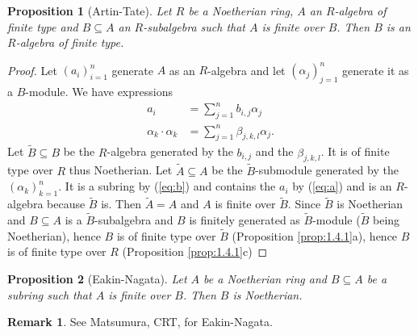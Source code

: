 \documentclass[DIV=14,parskip=half]{scrartcl}
\newtheorem{prop}{Proposition}[subsection]
\theoremstyle{definition}
\newtheorem{rem}{Remark}[subsection]
\begin{document}
 \begin{prop}[Artin-Tate]\label{prop:artinTate}
  Let $R$ be a Noetherian ring, $A$ an $R$-algebra of finite type and $B\subseteq A$ an $R$-subalgebra such that $A$ is finite over $B$. Then $B$ is an $R$-algebra of finite type.
 \end{prop}
 \begin{proof}
 Let $(a_i)_{i=1}^n$ generate $A$ as an $R$-algebra and let $(\alpha_j)_{j=1}^n$ generate it as a $B$-module. We have expressions
 \begin{align}
  a_i &=\sum_{j=1}^n b_{i,j} \alpha_j\label{eq:a}\\
  \alpha_k\cdot \alpha_k &= \sum_{j=1}^n \beta_{j,k,l} \alpha_j.\label{eq:b}
 \end{align}
Let $\tilde B\subseteq B$ be the $R$-algebra generated by the $b_{i,j}$ and the $\beta_{j,k,l}$. It is of finite type over $R$ thus Noetherian. Let $\tilde A\subseteq A$ be the $\tilde B$-submodule generated by the $(\alpha_k)_{k=1}^n$. It is a subring by (\ref{eq:b}) and contains the $a_i$ by (\ref{eq:a}) and is an $R$-algebra because $\tilde B$ is. Then $\tilde A=A$ and $A$ is finite over $\tilde B$. Since $\tilde B$ is Noetherian and $B\subseteq A$ is a $\tilde B$-subalgebra and $B$ is finitely generated as $\tilde B$-module ($\tilde B$ being Noetherian), hence $B$ is of finite type over $\tilde B$ (Proposition \ref{prop:1.4.1}a), hence $B$ is of finite type over $R$ (Proposition \ref{prop:1.4.1}c)
\end{proof}
\begin{prop}[Eakin-Nagata]\label{prop:eakinNagata}
 Let $A$ be a Noetherian ring and $B\subseteq A$ be a subring such that $A$ is finite over $B$. Then $B$ is Noetherian.
\end{prop}
\begin{rem}
 See Matsumura, CRT, for Eakin-Nagata.
\end{rem}
\end{document}
